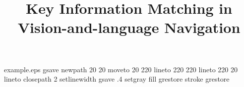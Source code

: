 %
%
%
%
%
\begin{filecontents*}{example.eps}
gsave
newpath
	20 20 moveto
	20 220 lineto
	220 220 lineto
	220 20 lineto
closepath
2 setlinewidth
gsave
	.4 setgray fill
grestore
stroke
grestore
\end{filecontents*}
%
\RequirePackage{fix-cm}
%
\documentclass[smallcondensed]{svjour3}     %
%
\smartqed  %
%
\usepackage{algorithmic}
\usepackage{amsmath,amssymb,amsfonts}
\usepackage{enumerate}
\usepackage{wrapfig}
\usepackage{graphicx}
\usepackage{appendix}
\usepackage{graphicx}
\usepackage{amsmath}
\usepackage{caption}
\usepackage{subfigure}
\usepackage{makecell}
\usepackage{multirow}
\usepackage{booktabs}
\usepackage{threeparttable}
\usepackage{geometry}
\usepackage{float}
\usepackage{indentfirst}
\usepackage[colorlinks,
linkcolor=blue,
anchorcolor=black,
citecolor=blue]{hyperref}
\geometry{top=2.5cm,bottom=2.5cm}
%
%
%
%
%

	
\title{Key Information Matching in Vision-and-language Navigation%
}
	
